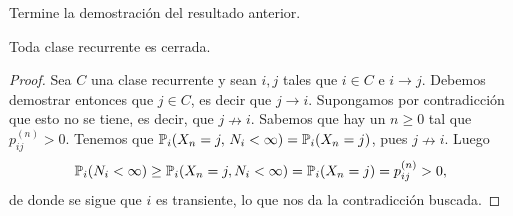 \begin{exer}
Termine la demostración del resultado anterior.
\end{exer}

\begin{prop}
Toda clase recurrente es cerrada.
\end{prop}

\begin{proof}
Sea $C$ una clase recurrente y sean $i,j$ tales que $i\in C$ e $i\rightarrow j$.
Debemos demostrar entonces que $j\in C$, es decir que $j\rightarrow i$.
Supongamos por contradicción que esto no se tiene, es decir, que $j\nrightarrow i$.
Sabemos que hay un $n\geq0$ tal que $p_{ij}^{(n)}>0$.
Tenemos que $\mathbb{P}_i(X_n=j,\,N_i<\infty)=\mathbb{P}_i(X_n=j)$, pues $j\nrightarrow i$.
Luego
\[\mathbb{P}_i(N_i<\infty)\geq\mathbb{P}_i(X_n=j,N_i<\infty)=\mathbb{P}_i(X_n=j)=p_{ij}^{(n)}>0,\]
de donde se sigue que $i$ es transiente, lo que nos da la contradicción buscada.
\end{proof}